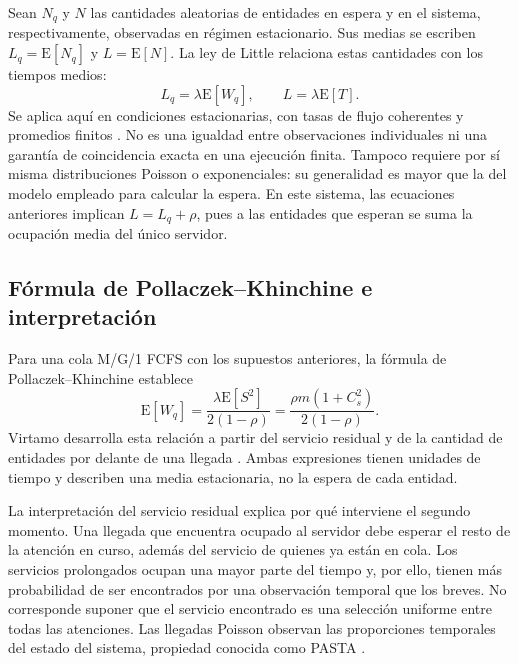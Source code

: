Sean $N_q$ y $N$ las cantidades aleatorias de entidades en espera y en el sistema, respectivamente, observadas en régimen estacionario. Sus medias se escriben $L_q=\mathrm{E}[N_q]$ y $L=\mathrm{E}[N]$. La ley de Little relaciona estas cantidades con los tiempos medios:
\begin{equation}
  L_q=\lambda\mathrm{E}[W_q], \qquad L=\lambda\mathrm{E}[T].
  \label{eq:ley-little}
\end{equation}
Se aplica aquí en condiciones estacionarias, con tasas de flujo coherentes y promedios finitos \cite{virtamoMG1}. No es una igualdad entre observaciones individuales ni una garantía de coincidencia exacta en una ejecución finita. Tampoco requiere por sí misma distribuciones Poisson o exponenciales: su generalidad es mayor que la del modelo empleado para calcular la espera. En este sistema, las ecuaciones anteriores implican $L=L_q+\rho$, pues a las entidades que esperan se suma la ocupación media del único servidor.

\subsection{Fórmula de Pollaczek--Khinchine e interpretación}
\label{subsec:pollaczek-khinchine}

Para una cola M/G/1 FCFS con los supuestos anteriores, la fórmula de Pollaczek--Khinchine establece
\begin{equation}
  \mathrm{E}[W_q]
  =\frac{\lambda\mathrm{E}[S^2]}{2(1-\rho)}
  =\frac{\rho m(1+C_s^2)}{2(1-\rho)}.
  \label{eq:pollaczek-khinchine}
\end{equation}
Virtamo desarrolla esta relación a partir del servicio residual y de la cantidad de entidades por delante de una llegada \cite{virtamoMG1}. Ambas expresiones tienen unidades de tiempo y describen una media estacionaria, no la espera de cada entidad.

La interpretación del servicio residual explica por qué interviene el segundo momento. Una llegada que encuentra ocupado al servidor debe esperar el resto de la atención en curso, además del servicio de quienes ya están en cola. Los servicios prolongados ocupan una mayor parte del tiempo y, por ello, tienen más probabilidad de ser encontrados por una observación temporal que los breves. No corresponde suponer que el servicio encontrado es una selección uniforme entre todas las atenciones. Las llegadas Poisson observan las proporciones temporales del estado del sistema, propiedad conocida como PASTA \cite{virtamoMG1}.

